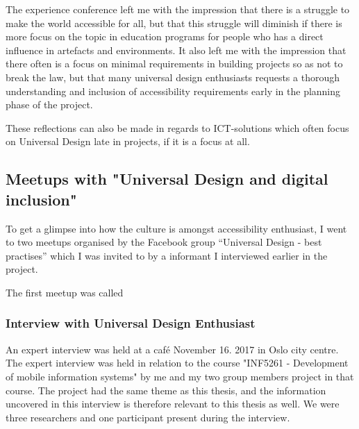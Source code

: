 The experience conference left me with the impression that there is a struggle to make the world accessible for all, but that this struggle will diminish if there is more focus on the topic in education programs for people who has a direct influence in artefacts and environments. It also left me with the impression that there often is a focus on minimal requirements in building projects so as not to break the law, but that many universal design enthusiasts requests a thorough understanding and inclusion of accessibility requirements early in the planning phase of the project.

These reflections can also be made in regards to ICT-solutions which often focus on Universal Design late in projects, if it is a focus at all. 

\subsection{Meetups with "Universal Design and digital inclusion"}
To get a glimpse into how the culture is amongst accessibility enthusiast, I went to two meetups organised by the Facebook group “Universal Design - best practises” which I was invited to by a informant I interviewed earlier in the project. 

The first meetup was called 









\subsubsection{Interview with Universal Design Enthusiast}
An expert interview was held at a café November 16. 2017 in Oslo city centre. The expert interview was held in relation to the course "INF5261 - Development of mobile information systems" by me and my two group members project in that course. The project had the same theme as this thesis, and the information uncovered in this interview is therefore relevant to this thesis as well. We were three researchers and one participant present during the interview.

